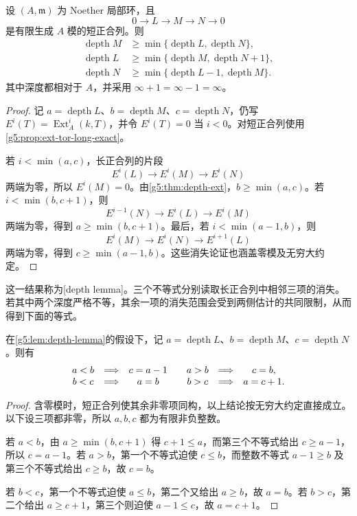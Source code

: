 \begin{lemma}[深度引理]\label{g5:lem:depth-lemma}
	设 \((A,\mathfrak m)\) 为 Noether 局部环，且
	\[
		0\longrightarrow L\longrightarrow M\longrightarrow N\longrightarrow0
	\]
	是有限生成 \(A\) 模的短正合列。则
	\begin{align*}
		\operatorname{depth}M
		&\geq\min\{\operatorname{depth}L,\operatorname{depth}N\},\\
		\operatorname{depth}L
		&\geq\min\{\operatorname{depth}M,\operatorname{depth}N+1\},\\
		\operatorname{depth}N
		&\geq\min\{\operatorname{depth}L-1,\operatorname{depth}M\}.
	\end{align*}
	其中深度都相对于 \(A\)，并采用 \(\infty+1=\infty-1=\infty\)。
\end{lemma}
\begin{proof}
	记 \(a=\operatorname{depth}L\)、\(b=\operatorname{depth}M\)、\(c=\operatorname{depth}N\)，仍写 \(E^i(T)=\operatorname{Ext}^i_A(k,T)\)，并令 \(E^i(T)=0\) 当 \(i<0\)。对短正合列使用\cref{g5:prop:ext-tor-long-exact}。

	若 \(i<\min(a,c)\)，长正合列的片段
	\[
		E^i(L)\longrightarrow E^i(M)\longrightarrow E^i(N)
	\]
	两端为零，所以 \(E^i(M)=0\)。由\cref{g5:thm:depth-ext}，\(b\geq\min(a,c)\)。若 \(i<\min(b,c+1)\)，则
	\[
		E^{i-1}(N)\longrightarrow E^i(L)\longrightarrow E^i(M)
	\]
	两端为零，得到 \(a\geq\min(b,c+1)\)。最后，若 \(i<\min(a-1,b)\)，则
	\[
		E^i(M)\longrightarrow E^i(N)\longrightarrow E^{i+1}(L)
	\]
	两端为零，得到 \(c\geq\min(a-1,b)\)。这些消失论证也涵盖零模及无穷大约定。
\end{proof}

这一结果称为[depth lemma]。三个不等式分别读取长正合列中相邻三项的消失。若其中两个深度严格不等，其余一项的消失范围会受到两侧估计的共同限制，从而得到下面的等式。

\begin{corollary}\label{g5:cor:depth-lemma-equalities}
	在\cref{g5:lem:depth-lemma}的假设下，记
	\(a=\operatorname{depth}L\)、\(b=\operatorname{depth}M\)、\(c=\operatorname{depth}N\)。则有
	\[
		\begin{array}{c@{\quad\Longrightarrow\quad}c@{\qquad}c@{\quad\Longrightarrow\quad}c}
			a<b & c=a-1 & a>b & c=b,\\
			b<c & a=b & b>c & a=c+1.
		\end{array}
	\]
\end{corollary}
\begin{proof}
	含零模时，短正合列使其余非零项同构，以上结论按无穷大约定直接成立。以下设三项都非零，所以 \(a,b,c\) 都为有限非负整数。

	若 \(a<b\)，由 \(a\geq\min(b,c+1)\) 得 \(c+1\leq a\)，而第三个不等式给出 \(c\geq a-1\)，所以 \(c=a-1\)。若 \(a>b\)，第一个不等式迫使 \(c\leq b\)，而整数不等式 \(a-1\geq b\) 及第三个不等式给出 \(c\geq b\)，故 \(c=b\)。

	若 \(b<c\)，第一个不等式迫使 \(a\leq b\)，第二个又给出 \(a\geq b\)，故 \(a=b\)。若 \(b>c\)，第二个给出 \(a\geq c+1\)，第三个则迫使 \(a-1\leq c\)，故 \(a=c+1\)。
\end{proof}

